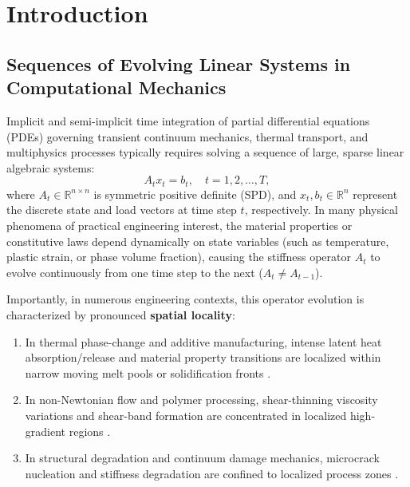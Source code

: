 \documentclass[preprint,12pt,3p]{elsarticle}
\begin{document}
\section{Introduction}
\label{sec:intro}

\subsection{Sequences of Evolving Linear Systems in Computational Mechanics}
Implicit and semi-implicit time integration of partial differential equations (PDEs) governing transient continuum mechanics, thermal transport, and multiphysics processes typically requires solving a sequence of large, sparse linear algebraic systems:
\begin{equation}
A_t x_t = b_t, \quad t = 1, 2, \dots, T,
\label{eq:seq_linear_systems}
\end{equation}
where $A_t \in \mathbb{R}^{n \times n}$ is symmetric positive definite (SPD), and $x_t, b_t \in \mathbb{R}^n$ represent the discrete state and load vectors at time step $t$, respectively. In many physical phenomena of practical engineering interest, the material properties or constitutive laws depend dynamically on state variables (such as temperature, plastic strain, or phase volume fraction), causing the stiffness operator $A_t$ to evolve continuously from one time step to the next ($A_t \neq A_{t-1}$).

Importantly, in numerous engineering contexts, this operator evolution is characterized by pronounced \textbf{spatial locality}:
\begin{enumerate}
    \item In thermal phase-change and additive manufacturing, intense latent heat absorption/release and material property transitions are localized within narrow moving melt pools or solidification fronts \cite{smith2019additive, michaleris2014modeling}.
    \item In non-Newtonian flow and polymer processing, shear-thinning viscosity variations and shear-band formation are concentrated in localized high-gradient regions \cite{bird1987dynamics}.
    \item In structural degradation and continuum damage mechanics, microcrack nucleation and stiffness degradation are confined to localized process zones \cite{lemaitre2005engineering}.
\end{enumerate}
\end{document}
